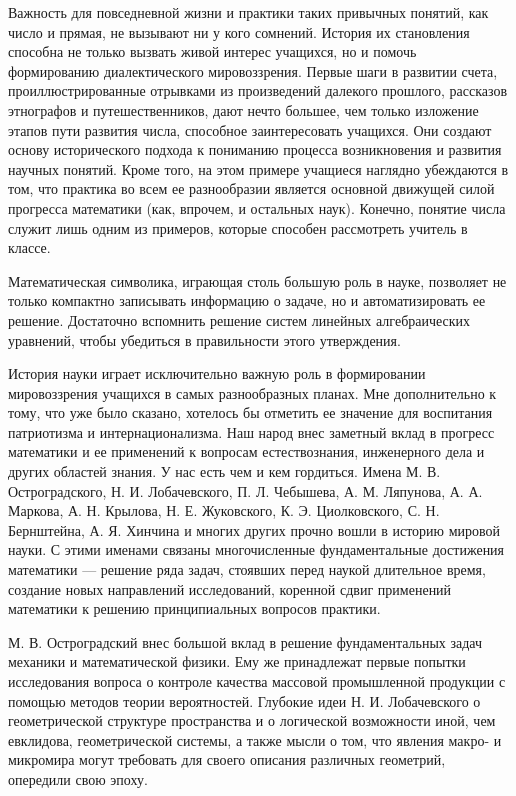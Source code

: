 \documentclass[12pt, a4paper, openany]{book}
\begin{document}
Важность для повседневной жизни и практики таких привычных понятий, как число и прямая, не вызывают ни у кого сомнений. История их становления способна не только вызвать живой интерес учащихся, но и помочь  формированию диалектического мировоззрения. Первые шаги в развитии счета, проиллюстрированные отрывками из произведений далекого прошлого, рассказов этнографов и путешественников, дают нечто большее, чем только изложение этапов пути развития числа, способное  заинтересовать учащихся. Они создают основу исторического подхода к пониманию процесса возникновения и развития научных понятий. Кроме того, на этом примере учащиеся наглядно убеждаются в том, что практика во всем ее  разнообразии является основной движущей силой прогресса  математики (как, впрочем, и остальных наук). Конечно,  понятие числа служит лишь одним из примеров, которые  способен рассмотреть учитель в классе. 

Математическая символика, играющая столь большую роль в науке, позволяет не только компактно записывать информацию о задаче, но и автоматизировать ее решение. Достаточно вспомнить решение систем линейных  алгебраических уравнений, чтобы убедиться в правильности этого утверждения. 

История науки играет исключительно важную роль в формировании мировоззрения учащихся в самых  разнообразных планах. Мне дополнительно к тому, что уже было сказано, хотелось бы отметить ее значение для воспитания патриотизма и интернационализма. Наш народ внес  заметный вклад в прогресс математики и ее применений к  вопросам естествознания, инженерного дела и других  областей знания. У нас есть чем и кем гордиться. Имена М. В. Остроградского, Н. И. Лобачевского, П. Л. Чебышева, А. М. Ляпунова, А. А. Маркова, А. Н. Крылова, Н. Е. Жуковского, К. Э. Циолковского, С. Н. Бернштейна, А. Я. Хинчина и многих других прочно вошли в историю мировой науки. С этими именами связаны многочисленные фундаментальные достижения математики — решение  ряда задач, стоявших перед наукой длительное время,  создание новых направлений исследований, коренной сдвиг применений математики к решению принципиальных  вопросов практики. 

М. В. Остроградский внес большой вклад в решение фундаментальных задач механики и математической  физики. Ему же принадлежат первые попытки исследования  вопроса о контроле качества массовой промышленной  продукции с помощью методов теории вероятностей. Глубокие идеи Н. И. Лобачевского о геометрической структуре  пространства и о логической возможности иной, чем  евклидова, геометрической системы, а также мысли о том, что явления макро- и микромира могут требовать для своего описания различных геометрий, опередили свою эпоху. 
\end{document}
